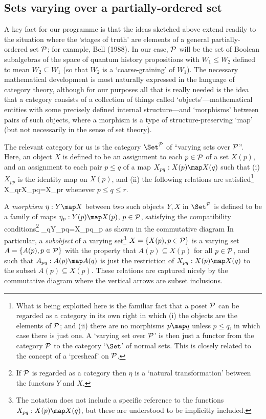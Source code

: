 \subsection{Sets varying over a partially-ordered set}
A key fact for our programme is that the ideas sketched above extend
readily to the situation where the `stages of truth' are elements of
a general partially-ordered set $\cal P$; for example, Bell (1988).
In our case, $\cal P$ will be the set of Boolean subalgebras of the
space of quantum history propositions with $W_1\leq W_2$ defined to
mean $W_2\subseteq W_1$ (so that $W_2$ is a `coarse-graining' of
$W_1$). The necessary mathematical development is most naturally
expressed in the language of category theory, although for our
purposes all that is really needed is the idea that a category
consists of a collection of things called `objects'---mathematical
entities with some precisely defined internal structure---and
`morphisms' between pairs of such objects, where a morphism is a
type of structure-preserving `map' (but not necessarily in the sense
of set theory).

	The relevant category for us is the category $\Set^{\cal P}$ of
``varying sets over $\cal P$''. Here, an object $X$ is defined to be
an assignment to each $p\in\cal P$ of a set $X(p)$, and an
assignment to each pair $p\leq q$ of a map $X_{pq}:X(p)\map X(q)$
such that (i) $X_{pp}$ is the identity map on $X(p)$, and (ii) the
following relations are satisfied\footnote{What is being exploited
here is the familiar fact that a poset $\cal P$ can be regarded as a
category in its own right in which (i) the objects are the elements
of $\cal P$; and (ii) there are no morphisms $p\map q$ unless $p\leq
q$, in which case there is just one. A `varying set over $\cal P$'
is then just a functor from the category $\cal P$ to the category
`$\Set$' of normal sets.  This is closely related to the concept of
a `presheaf' on $\cal P$.}
\beq
		X_{qr}\circ X_{pq}=X_{pr}
\eeq
whenever $p\leq q\leq r$. 

	A {\em morphism\/} $\eta:Y\map X$ between two such objects $Y,X$
in $\Set^{\cal P}$ is defined to be a family of maps
$\eta_p:Y(p)\map X(p)$, $p\in\cal P$, satisfying the compatibility
conditions\footnote{If $\cal P$ is regarded as a category then
$\eta$ is a `natural transformation' between the functors $Y$ and
$X$.}
\beq
		\eta_q\circ Y_{pq}=X_{pq}\circ\eta_p
\eeq 
as shown in the commutative diagram
\beq
\eeq
In particular, a {\em subobject\/} of a varying set\footnote{The
notation does not include a specific reference to the functions
$X_{pq}:X(p)\map X(q)$, but these are understood to be implicitly
included.}  $X=\{X(p),p\in{\cal P}\}$ is a varying set
$A=\{A(p),p\in{\cal P}\}$ with the property that $A(p)\subseteq
X(p)$ for all $p\in\cal P$, and such that $A_{pq}:A(p)\map A(q)$ is
just the restriction of $X_{pq}:X(p)\map X(q)$ to the subset
$A(p)\subseteq X(p)$. These relations are captured nicely by the
commutative diagram
\beq
{}	
							\label{cd}
\eeq
where the vertical arrows are subset inclusions.

